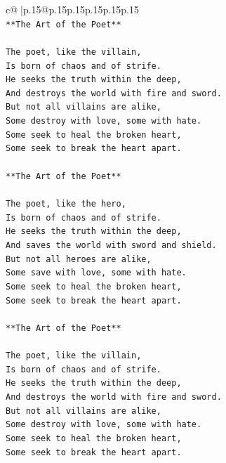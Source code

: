 \documentclass{article}
\begin{document}
{\begin{supertabular}{c@{$\;$}|p{.15\linewidth}@{}p{.15\linewidth}p{.15\linewidth}p{.15\linewidth}p{.15\linewidth}p{.15\linewidth}}
{{{\\ 
\texttt{**The Art of the Poet**} \\
\\ 
\texttt{The poet, like the villain,} \\
\texttt{Is born of chaos and of strife.} \\
\texttt{He seeks the truth within the deep,} \\
\texttt{And destroys the world with fire and sword.} \\
\texttt{But not all villains are alike,} \\
\texttt{Some destroy with love, some with hate.} \\
\texttt{Some seek to heal the broken heart,} \\
\texttt{Some seek to break the heart apart.} \\
\\ 
\texttt{**The Art of the Poet**} \\
\\ 
\texttt{The poet, like the hero,} \\
\texttt{Is born of chaos and of strife.} \\
\texttt{He seeks the truth within the deep,} \\
\texttt{And saves the world with sword and shield.} \\
\texttt{But not all heroes are alike,} \\
\texttt{Some save with love, some with hate.} \\
\texttt{Some seek to heal the broken heart,} \\
\texttt{Some seek to break the heart apart.} \\
\\ 
\texttt{**The Art of the Poet**} \\
\\ 
\texttt{The poet, like the villain,} \\
\texttt{Is born of chaos and of strife.} \\
\texttt{He seeks the truth within the deep,} \\
\texttt{And destroys the world with fire and sword.} \\
\texttt{But not all villains are alike,} \\
\texttt{Some destroy with love, some with hate.} \\
\texttt{Some seek to heal the broken heart,} \\
\texttt{Some seek to break the heart apart.} \\
\\ 
}}}
\end{supertabular}}
\end{document}
